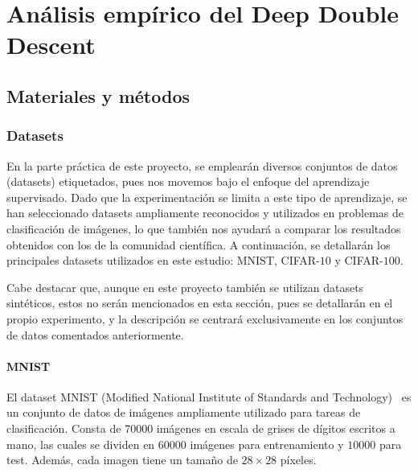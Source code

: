 
\chapter{Análisis empírico del Deep Double Descent}\label{ch:analisis-empirico-ddd}

\section{Materiales y métodos}\label{sec:materiales-y-metodos}

\subsection{Datasets}\label{subsec:datasets}

En la parte práctica de este proyecto, se emplearán diversos conjuntos de datos (datasets) etiquetados, pues nos movemos bajo el enfoque del aprendizaje supervisado. Dado que la experimentación se limita a este tipo de aprendizaje, se han seleccionado datasets ampliamente reconocidos y utilizados en problemas de clasificación de imágenes, lo que también nos ayudará a comparar los resultados obtenidos con los de la comunidad científica. A continuación, se detallarán los principales datasets utilizados en este estudio: MNIST, CIFAR-$10$ y CIFAR-$100$.\newline

Cabe destacar que, aunque en este proyecto también se utilizan datasets sintéticos, estos no serán mencionados en esta sección, pues se detallarán en el propio experimento, y la descripción se centrará exclusivamente en los conjuntos de datos comentados anteriormente.\newline

\subsubsection{MNIST}\label{subsubsec:MNIST}

El dataset MNIST (Modified National Institute of Standards and Technology)~\cite{LeCun2005TheMD} es un conjunto de datos de imágenes ampliamente utilizado para tareas de clasificación. Consta de $70000$ imágenes en escala de grises de dígitos escritos a mano, las cuales se dividen en $60000$ imágenes para entrenamiento y $10000$ para test. Además, cada imagen tiene un tamaño de $28 \times 28$ píxeles.\newline

